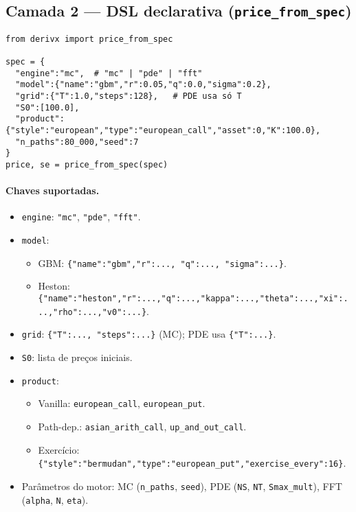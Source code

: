\documentclass[11pt,a4paper]{article}
\begin{document}
\subsection{Camada 2 — DSL declarativa (\texttt{price\_from\_spec})}
\begin{lstlisting}[style=pystyle]
from derivx import price_from_spec

spec = {
  "engine":"mc",  # "mc" | "pde" | "fft"
  "model":{"name":"gbm","r":0.05,"q":0.0,"sigma":0.2},
  "grid":{"T":1.0,"steps":128},   # PDE usa só T
  "S0":[100.0],
  "product":{"style":"european","type":"european_call","asset":0,"K":100.0},
  "n_paths":80_000,"seed":7
}
price, se = price_from_spec(spec)
\end{lstlisting}

\paragraph{Chaves suportadas.}
\begin{itemize}[leftmargin=1.2em]
\item \texttt{engine}: \verb|"mc"|, \verb|"pde"|, \verb|"fft"|.
\item \texttt{model}:
\begin{itemize}[nosep]
\item GBM: \verb|{"name":"gbm","r":..., "q":..., "sigma":...}|.
\item Heston: \verb|{"name":"heston","r":...,"q":...,"kappa":...,"theta":...,"xi":...,"rho":...,"v0":...}|.
\end{itemize}
\item \texttt{grid}: \verb|{"T":..., "steps":...}| (MC); PDE usa \verb|{"T":...}|.
\item \texttt{S0}: lista de preços iniciais.
\item \texttt{product}:
\begin{itemize}[nosep]
\item Vanilla: \verb|european_call|, \verb|european_put|.
\item Path-dep.: \verb|asian_arith_call|, \verb|up_and_out_call|.
\item Exercício: \verb|{"style":"bermudan","type":"european_put","exercise_every":16}|.
\end{itemize}
\item Parâmetros do motor: MC (\verb|n_paths|, \verb|seed|), PDE (\verb|NS|, \verb|NT|, \verb|Smax_mult|),
FFT (\verb|alpha|, \verb|N|, \verb|eta|).
\end{itemize}
\end{document}
